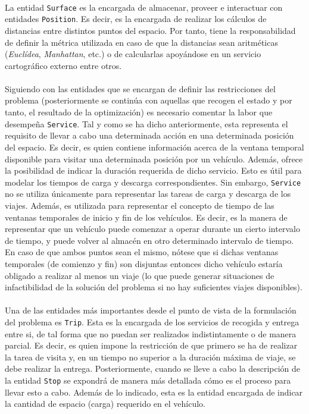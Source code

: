 \documentclass{subfiles}
\begin{document}
          \paragraph{}
          La entidad \texttt{Surface} es la encargada de almacenar, proveer e interactuar con entidades \texttt{Position}. Es decir, es la encargada de realizar los cálculos de distancias entre distintos puntos del espacio. Por tanto, tiene la responsabilidad de definir la métrica utilizada en caso de que la distancias sean aritméticas (\emph{Euclídea}, \emph{Manhattan}, etc.) o de calcularlas apoyándose en un servicio cartográfico externo entre otros.

          \paragraph{}
          Siguiendo con las entidades que se encargan de definir las restricciones del problema (posteriormente se continúa con aquellas que recogen el estado y por tanto, el resultado de la optimización) es necesario comentar la labor que desempeña \texttt{Service}. Tal y como se ha dicho anteriormente, esta representa el requisito de llevar a cabo una determinada acción en una determinada posición del espacio. Es decir, es quien contiene información acerca de la ventana temporal disponible para visitar una determinada posición por un vehículo. Además, ofrece la posibilidad de indicar la duración requerida de dicho servicio. Esto es útil para modelar los tiempos de carga y descarga correspondientes. Sin embargo, \texttt{Service} no se utiliza únicamente para representar las tareas de carga y descarga de los viajes. Además, es utilizada para representar el concepto de tiempo de las ventanas temporales de inicio y fin de los vehículos. Es decir, es la manera de representar que un vehículo puede comenzar a operar durante un cierto intervalo de tiempo, y puede volver al almacén en otro determinado intervalo de tiempo. En caso de que ambos puntos sean el mismo, nótese que si dichas ventanas temporales (de comienzo y fin) son disjuntas entonces dicho vehículo estaría obligado a realizar al menos un viaje (lo que puede generar situaciones de infactibilidad de la solución del problema si no hay suficientes viajes disponibles).

          \paragraph{}
          Una de las entidades más importantes desde el punto de vista de la formulación del problema es \texttt{Trip}. Esta es la encargada de  los servicios de recogida y entrega entre si, de tal forma que no puedan ser realizados indistintamente o de manera parcial. Es decir, es quien impone la restricción de que primero se ha de realizar la tarea de visita y, en un tiempo no superior a la duración máxima de viaje, se debe realizar la entrega. Posteriormente, cuando se lleve a cabo la descripción de la entidad \texttt{Stop} se expondrá de manera más detallada cómo es el proceso para llevar esto a cabo. Además de lo indicado, esta es la entidad encargada de indicar la cantidad de espacio (carga) requerido en el vehículo.
\end{document}
